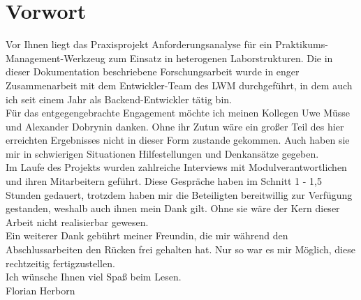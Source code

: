 \chapter*{Vorwort}

Vor Ihnen liegt das Praxisprojekt \glqq Anforderungsanalyse für ein Praktikums-Management-Werkzeug zum Einsatz in heterogenen Laborstrukturen\grqq . Die in dieser Dokumentation beschriebene Forschungsarbeit wurde in enger Zusammenarbeit mit dem Entwickler-Team des LWM durchgeführt, in dem auch ich seit einem Jahr als Backend-Entwickler tätig bin.\\

Für das entgegengebrachte Engagement möchte ich meinen Kollegen Uwe Müsse und
Alexander Dobrynin danken. Ohne ihr Zutun wäre ein großer Teil des hier erreichten Ergebnisses nicht in dieser Form zustande gekommen. Auch haben sie mir in schwierigen Situationen Hilfestellungen und Denkansätze gegeben.\\

Im Laufe des Projekts wurden zahlreiche Interviews mit Modulverantwortlichen und ihren Mitarbeitern geführt. Diese Gespräche haben im Schnitt 1 - 1,5 Stunden gedauert, trotzdem haben mir die Beteiligten bereitwillig zur Verfügung gestanden, weshalb auch ihnen mein Dank gilt. Ohne sie wäre der Kern dieser Arbeit nicht realisierbar gewesen.\\

Ein weiterer Dank gebührt meiner Freundin, die mir während den Abschlussarbeiten den Rücken frei gehalten hat. Nur so war es mir Möglich, diese rechtzeitig fertigzustellen.\\

Ich wünsche Ihnen viel Spaß beim Lesen.\\

Florian Herborn